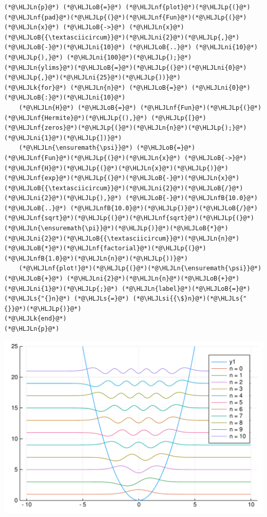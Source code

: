 \documentclass[12pt,a4paper]{article}
\newcommand{\HLJLk}[1]{\textcolor[RGB]{148,91,176}{\textbf{#1}}}
\newcommand{\HLJLn}[1]{#1}
\newcommand{\HLJLnf}[1]{\textcolor[RGB]{66,102,213}{#1}}
\newcommand{\HLJLs}[1]{\textcolor[RGB]{201,61,57}{#1}}
\newcommand{\HLJLsi}[1]{#1}
\newcommand{\HLJLnfB}[1]{\textcolor[RGB]{59,151,46}{#1}}
\newcommand{\HLJLni}[1]{\textcolor[RGB]{59,151,46}{#1}}
\newcommand{\HLJLoB}[1]{\textcolor[RGB]{102,102,102}{\textbf{#1}}}
\newcommand{\HLJLp}[1]{#1}
\begin{document}
\begin{lstlisting}
(*@\HLJLn{p}@*) (*@\HLJLoB{=}@*) (*@\HLJLnf{plot}@*)(*@\HLJLp{(}@*)(*@\HLJLnf{pad}@*)(*@\HLJLp{(}@*)(*@\HLJLnf{Fun}@*)(*@\HLJLp{(}@*)(*@\HLJLn{x}@*) (*@\HLJLoB{->}@*) (*@\HLJLn{x}@*)(*@\HLJLoB{{\textasciicircum}}@*)(*@\HLJLni{2}@*)(*@\HLJLp{,}@*) (*@\HLJLoB{-}@*)(*@\HLJLni{10}@*) (*@\HLJLoB{..}@*) (*@\HLJLni{10}@*)(*@\HLJLp{),}@*) (*@\HLJLni{100}@*)(*@\HLJLp{);}@*) (*@\HLJLn{ylims}@*)(*@\HLJLoB{=}@*)(*@\HLJLp{(}@*)(*@\HLJLni{0}@*)(*@\HLJLp{,}@*)(*@\HLJLni{25}@*)(*@\HLJLp{))}@*)
(*@\HLJLk{for}@*) (*@\HLJLn{n}@*) (*@\HLJLoB{=}@*) (*@\HLJLni{0}@*)(*@\HLJLoB{:}@*)(*@\HLJLni{10}@*)
    (*@\HLJLn{H}@*) (*@\HLJLoB{=}@*) (*@\HLJLnf{Fun}@*)(*@\HLJLp{(}@*)(*@\HLJLnf{Hermite}@*)(*@\HLJLp{(),}@*) (*@\HLJLp{[}@*)(*@\HLJLnf{zeros}@*)(*@\HLJLp{(}@*)(*@\HLJLn{n}@*)(*@\HLJLp{);}@*)(*@\HLJLni{1}@*)(*@\HLJLp{])}@*)
    (*@\HLJLn{\ensuremath{\psi}}@*) (*@\HLJLoB{=}@*) (*@\HLJLnf{Fun}@*)(*@\HLJLp{(}@*)(*@\HLJLn{x}@*) (*@\HLJLoB{->}@*) (*@\HLJLnf{H}@*)(*@\HLJLp{(}@*)(*@\HLJLn{x}@*)(*@\HLJLp{)}@*)(*@\HLJLnf{exp}@*)(*@\HLJLp{(}@*)(*@\HLJLoB{-}@*)(*@\HLJLn{x}@*)(*@\HLJLoB{{\textasciicircum}}@*)(*@\HLJLni{2}@*)(*@\HLJLoB{/}@*)(*@\HLJLni{2}@*)(*@\HLJLp{),}@*) (*@\HLJLoB{-}@*)(*@\HLJLnfB{10.0}@*) (*@\HLJLoB{..}@*) (*@\HLJLnfB{10.0}@*)(*@\HLJLp{)}@*)(*@\HLJLoB{/}@*)(*@\HLJLnf{sqrt}@*)(*@\HLJLp{(}@*)(*@\HLJLnf{sqrt}@*)(*@\HLJLp{(}@*)(*@\HLJLn{\ensuremath{\pi}}@*)(*@\HLJLp{)}@*)(*@\HLJLoB{*}@*)(*@\HLJLni{2}@*)(*@\HLJLoB{{\textasciicircum}}@*)(*@\HLJLn{n}@*)(*@\HLJLoB{*}@*)(*@\HLJLnf{factorial}@*)(*@\HLJLp{(}@*)(*@\HLJLnfB{1.0}@*)(*@\HLJLn{n}@*)(*@\HLJLp{))}@*)
    (*@\HLJLnf{plot!}@*)(*@\HLJLp{(}@*)(*@\HLJLn{\ensuremath{\psi}}@*) (*@\HLJLoB{+}@*) (*@\HLJLni{2}@*)(*@\HLJLn{n}@*)(*@\HLJLoB{+}@*)(*@\HLJLni{1}@*)(*@\HLJLp{;}@*) (*@\HLJLn{label}@*)(*@\HLJLoB{=}@*)(*@\HLJLs{"{}n}@*) (*@\HLJLs{=}@*) (*@\HLJLsi{{\$}n}@*)(*@\HLJLs{"{}}@*)(*@\HLJLp{)}@*)
(*@\HLJLk{end}@*)
(*@\HLJLn{p}@*)
\end{lstlisting}

\includegraphics[width=\linewidth]{figures/Lecture24_8_1.pdf}
\end{document}
